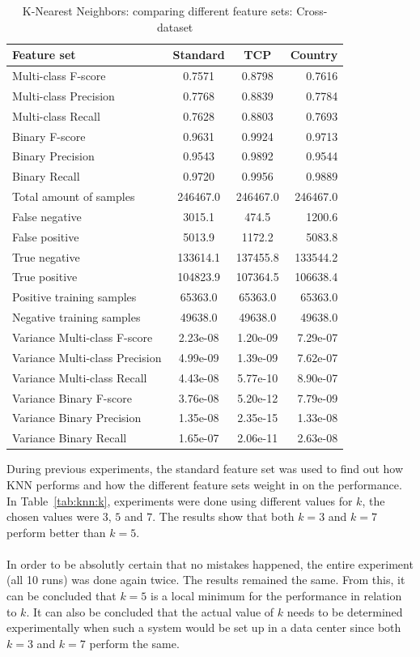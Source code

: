 \begin{table}[H]
\caption{K-Nearest Neighbors: comparing different feature sets: Cross-dataset}
\label{tab:knn:cross}
\centering
\begin{tabular}{l c c r}
\toprule
Feature set & Standard & TCP & Country \\
\midrule
Multi-class F-score & 0.7571 & 0.8798 & 0.7616 \\
Multi-class Precision & 0.7768 & 0.8839 & 0.7784 \\
Multi-class Recall & 0.7628 & 0.8803 & 0.7693 \\
\midrule
Binary F-score & 0.9631 & 0.9924 & 0.9713\\
Binary Precision & 0.9543 & 0.9892 & 0.9544 \\
Binary Recall & 0.9720 & 0.9956 & 0.9889\\
\midrule
Total amount of samples & 246467.0 & 246467.0 & 246467.0 \\
False negative & 3015.1 & 474.5 & 1200.6 \\
False positive & 5013.9 & 1172.2 & 5083.8 \\
True negative & 133614.1 & 137455.8 & 133544.2 \\
True positive & 104823.9 & 107364.5 & 106638.4 \\
\midrule
Positive training samples & 65363.0 & 65363.0 & 65363.0\\
Negative training samples & 49638.0 & 49638.0 & 49638.0\\
\midrule
Variance Multi-class F-score & 2.23e-08 & 1.20e-09 & 7.29e-07 \\
Variance Multi-class Precision & 4.99e-09 & 1.39e-09 & 7.62e-07 \\
Variance Multi-class Recall & 4.43e-08 & 5.77e-10 & 8.90e-07  \\
\midrule
Variance Binary F-score & 3.76e-08 & 5.20e-12 & 7.79e-09 \\
Variance Binary Precision & 1.35e-08 & 2.35e-15 & 1.33e-08 \\
Variance Binary Recall & 1.65e-07 & 2.06e-11 & 2.63e-08 \\
\bottomrule
\end{tabular}
\end{table}

\noindent During previous experiments, the standard feature set was used to find out how KNN performs and how the different feature sets weight in on the performance. In Table~\ref{tab:knn:k}, experiments were done using different values for $k$, the chosen values were $3$, $5$ and $7$. The results show that both $k=3$ and $k=7$ perform better than $k=5$. \\
\\
In order to be absolutly certain that no mistakes happened, the entire experiment (all 10 runs) was done again twice. The results remained the same. From this, it can be concluded that $k=5$ is a local minimum for the performance in relation to $k$. It can also be concluded that the actual value of $k$ needs to be determined experimentally when such a system would be set up in a data center since both $k=3$ and $k=7$ perform the same.  

